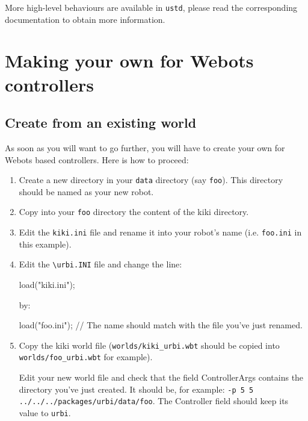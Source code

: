 More high-level behaviours are available in \nolinkurl{ustd}, please
read the corresponding documentation to obtain more information.



\section{Making your own \urbi for Webots controllers}
\label{webots.own}%

\subsection{Create from an existing world}
\label{webots.own.create}%

     As soon as you will want to go further, you will have to create your own
    \urbi for Webots based controllers. Here is how to proceed:

\begin{enumerate}

\item      Create a new directory in your \nolinkurl{data} directory
     (say \nolinkurl{foo}). This directory should be named as your
     new robot.



\item      Copy into your \nolinkurl{foo} directory the content
     of the kiki directory.



\item     Edit the \nolinkurl{kiki.ini} file and rename it into your
    robot's name (i.e. \nolinkurl{foo.ini} in this example).



\item     Edit the \nolinkurl{\urbi.INI} file and change the line:


\begin{urbifixme}
load("kiki.ini");
\end{urbifixme}

by:

\begin{urbifixme}
load("foo.ini"); // The name should match with the file you've just renamed.
\end{urbifixme}




\item Copy the kiki world file (\nolinkurl{worlds/kiki_urbi.wbt}
  should be copied into \nolinkurl{worlds/foo_urbi.wbt} for example).


  Edit your new world file and check that the field ControllerArgs
  contains the directory you've just created. It should be, for
  example: \texttt{-{}\-p 5 5
    .\-.\-/\-.\-.\-/\-.\-.\-/\-p\-a\-c\-k\-a\-g\-e\-s\-/\-u\-r\-b\-i\-/\-d\-a\-t\-a\-/\-f\-o\-o}.
  The Controller field should keep its value to \texttt{u\-r\-b\-i}.


\end{enumerate}

